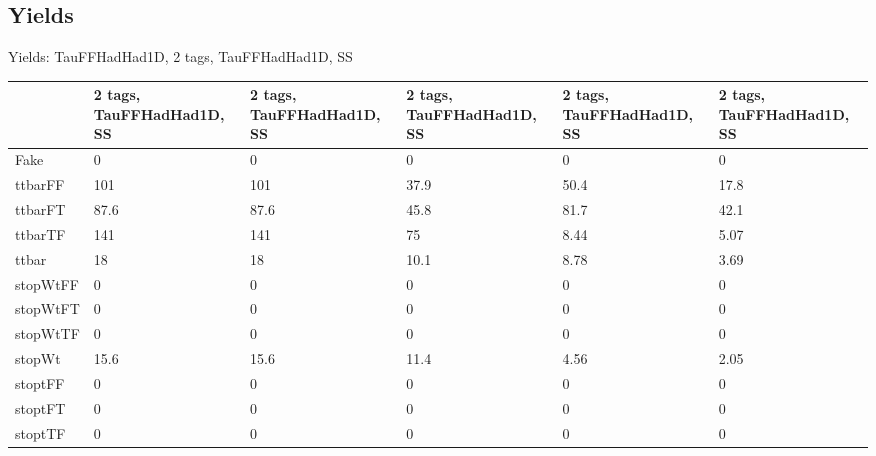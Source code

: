 
\subsection{Yields}

\begin{frame}{Yields: TauFFHadHad1D, 2 tags, TauFFHadHad1D, SS}
\begin{center}
  \begin{tabular}{l| >{\centering\let\newline\\\arraybackslash\hspace{0pt}}m{1.4cm}| >{\centering\let\newline\\\arraybackslash\hspace{0pt}}m{1.4cm}| >{\centering\let\newline\\\arraybackslash\hspace{0pt}}m{1.4cm}| >{\centering\let\newline\\\arraybackslash\hspace{0pt}}m{1.4cm}| >{\centering\let\newline\\\arraybackslash\hspace{0pt}}m{1.4cm}}
    & 2 tags, TauFFHadHad1D, SS & 2 tags, TauFFHadHad1D, SS & 2 tags, TauFFHadHad1D, SS & 2 tags, TauFFHadHad1D, SS & 2 tags, TauFFHadHad1D, SS \\
 \hline \hline
    Fake& 0 & 0 & 0 & 0 & 0 \\
 \hline
    ttbarFF& 101 & 101 & 37.9 & 50.4 & 17.8 \\
 \hline
    ttbarFT& 87.6 & 87.6 & 45.8 & 81.7 & 42.1 \\
 \hline
    ttbarTF& 141 & 141 & 75 & 8.44 & 5.07 \\
 \hline
    ttbar& 18 & 18 & 10.1 & 8.78 & 3.69 \\
 \hline
    stopWtFF& 0 & 0 & 0 & 0 & 0 \\
 \hline
    stopWtFT& 0 & 0 & 0 & 0 & 0 \\
 \hline
    stopWtTF& 0 & 0 & 0 & 0 & 0 \\
 \hline
    stopWt& 15.6 & 15.6 & 11.4 & 4.56 & 2.05 \\
 \hline
    stoptFF& 0 & 0 & 0 & 0 & 0 \\
 \hline
    stoptFT& 0 & 0 & 0 & 0 & 0 \\
 \hline
    stoptTF& 0 & 0 & 0 & 0 & 0 \\

\end{tabular}
\end{center}
\end{frame}
